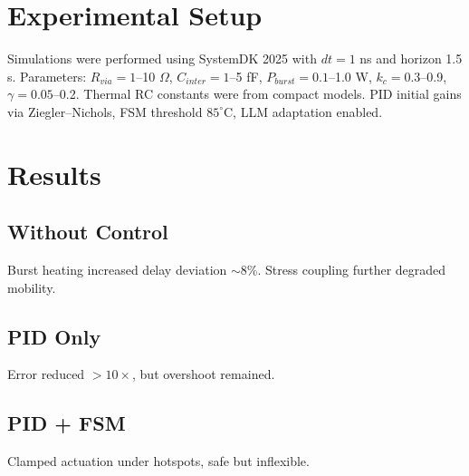\documentclass[conference]{IEEEtran}
\begin{document}
\section{Experimental Setup}
Simulations were performed using SystemDK 2025 with $dt=1$ ns and horizon 1.5 s. Parameters:  
$R_{via}=1$--10 $\Omega$, $C_{inter}=1$--5 fF, $P_{burst}=0.1$--1.0 W, $k_c=0.3$--0.9, $\gamma=0.05$--0.2.  
Thermal RC constants were from compact models. PID initial gains via Ziegler–Nichols, FSM threshold $85^\circ$C, LLM adaptation enabled.

\section{Results}
\subsection{Without Control}
Burst heating increased delay deviation $\sim$8\%. Stress coupling further degraded mobility.  
\subsection{PID Only}
Error reduced $>10\times$, but overshoot remained.  
\subsection{PID + FSM}
Clamped actuation under hotspots, safe but inflexible.  
\end{document}
